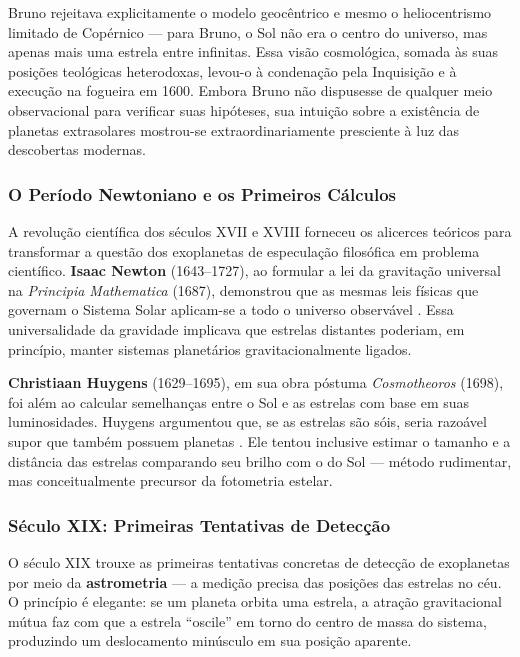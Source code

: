 \documentclass[
	12pt,
	openany,
	oneside,
	a4paper,
	english,
	brazil
]{abntex2}
\begin{document}
Bruno rejeitava explicitamente o modelo geocêntrico e mesmo o heliocentrismo limitado de Copérnico --- para Bruno, o Sol não era o centro do universo, mas apenas mais uma estrela entre infinitas. Essa visão cosmológica, somada às suas posições teológicas heterodoxas, levou-o à condenação pela Inquisição e à execução na fogueira em 1600. Embora Bruno não dispusesse de qualquer meio observacional para verificar suas hipóteses, sua intuição sobre a existência de planetas extrasolares mostrou-se extraordinariamente presciente à luz das descobertas modernas.

\subsubsection{O Período Newtoniano e os Primeiros Cálculos}

A revolução científica dos séculos XVII e XVIII forneceu os alicerces teóricos para transformar a questão dos exoplanetas de especulação filosófica em problema científico. \textbf{Isaac Newton} (1643--1727), ao formular a lei da gravitação universal na \textit{Principia Mathematica} (1687), demonstrou que as mesmas leis físicas que governam o Sistema Solar aplicam-se a todo o universo observável \cite{newton1687}. Essa universalidade da gravidade implicava que estrelas distantes poderiam, em princípio, manter sistemas planetários gravitacionalmente ligados.

\textbf{Christiaan Huygens} (1629--1695), em sua obra póstuma \textit{Cosmotheoros} (1698), foi além ao calcular semelhanças entre o Sol e as estrelas com base em suas luminosidades. Huygens argumentou que, se as estrelas são sóis, seria razoável supor que também possuem planetas \cite{huygens1698}. Ele tentou inclusive estimar o tamanho e a distância das estrelas comparando seu brilho com o do Sol --- método rudimentar, mas conceitualmente precursor da fotometria estelar.

\subsubsection{Século XIX: Primeiras Tentativas de Detecção}

O século XIX trouxe as primeiras tentativas concretas de detecção de exoplanetas por meio da \textbf{astrometria} --- a medição precisa das posições das estrelas no céu. O princípio é elegante: se um planeta orbita uma estrela, a atração gravitacional mútua faz com que a estrela ``oscile'' em torno do centro de massa do sistema, produzindo um deslocamento minúsculo em sua posição aparente.
\end{document}
